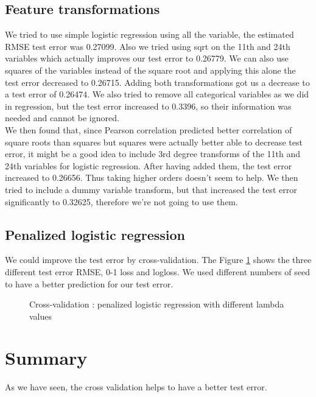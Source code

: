 \documentclass{article} %
\begin{document}
\subsection{Feature transformations}
\label{sec:ftransclass}
We tried to use simple logistic regression using all the variable, the estimated RMSE test error was 0.27099. Also we tried using sqrt on the 11th and 24th variables which actually improves our test error to 0.26779. We can also use squares of the variables instead of the square root and applying this alone the test error decreased to 0.26715. Adding both transformations got us a decrease to a test error of 0.26474. We also tried to remove all categorical variables as we did in regression, but the test error increased to 0.3396, so their information was needed and cannot be ignored.\\

We then found that, since Pearson correlation predicted better correlation of square roots than squares but squares were actually better able to decrease test error, it might be a good idea to include 3rd degree transforms of the 11th and 24th variables for logistic regression. After having added them, the test error increased to 0.26656. Thus taking higher orders doesn’t seem to help. We then tried to include a dummy variable transform, but that increased the test error significantly to 0.32625, therefore we’re not going to use them.
\subsection{Penalized logistic regression}
We could improve the test error by cross-validation. The Figure \ref{fig:crossval} shows the three different test error RMSE, 0-1 loss and logloss. We used different numbers of seed to have a better prediction for our test error.
\begin{figure}
\centering
{}
\caption{Cross-validation : penalized logistic regression with different lambda values}
\label{fig:crossval}
\end{figure} 
\section{Summary}
As we have seen, the cross validation helps to have a better test error.\\
\end{document}
